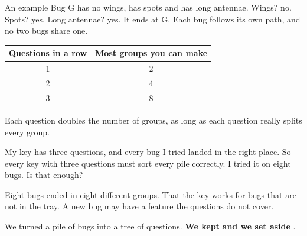 \begin{worked}{An example}
Bug G has no wings, has spots and has long antennae. Wings? no. Spots? yes. Long antennae? yes. It ends at G. Each bug follows its own path, and no two bugs share one.
\end{worked}

\begin{center}
\sffamily\small\renewcommand{\arraystretch}{1.5}
\begin{tabular}{@{}cc@{}}
\toprule
\textbf{Questions in a row} & \textbf{Most groups you can make}\\
\midrule
1 & 2\\
2 & 4\\
3 & 8\\
\bottomrule
\end{tabular}
\end{center}
Each question doubles the number of groups, as long as each question really splits every group.

\begin{center}
\end{center}

\begin{multix}[hmm]\multixbot[hmm]\tcblower
My key has three questions, and every bug I tried landed in the right place. So every key with three questions must sort every pile correctly. I tried it on eight bugs. Is that enough?
\end{multix}

{Eight bugs ended in eight different groups.}
{That the key works for bugs that are not in the tray. A new bug may have a feature the questions do not cover.}

\begin{keepbox}
We turned a pile of bugs into a tree of questions. \textbf{We kept} \wline[3.4cm] \textbf{and we set aside} \wline[3.4cm].
\end{keepbox}

